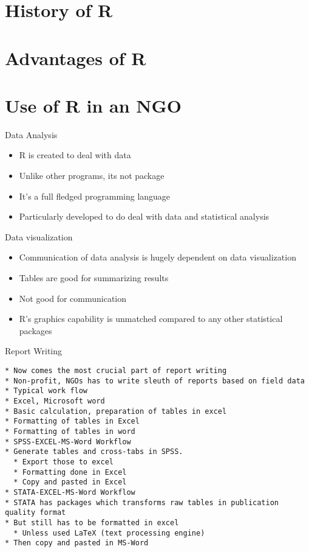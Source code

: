 \section{History of R}\label{history-of-r}

\section{Advantages of R}\label{advantages-of-r}

\section{Use of R in an NGO}\label{use-of-r-in-an-ngo}

\begin{frame}{Data Analysis}

\begin{itemize}
\tightlist
\item
  R is created to deal with data
\item
  Unlike other programs, its not package
\item
  It's a full fledged programming language
\item
  Particularly developed to do deal with data and statistical analysis
\end{itemize}

\end{frame}

\begin{frame}{Data visualization}

\begin{itemize}
\tightlist
\item
  Communication of data analysis is hugely dependent on data
  visualization
\item
  Tables are good for summarizing results
\item
  Not good for communication
\item
  R's graphics capability is unmatched compared to any other statistical
  packages
\end{itemize}

\end{frame}

\begin{frame}[fragile]{Report Writing}

\begin{verbatim}
* Now comes the most crucial part of report writing
* Non-profit, NGOs has to write sleuth of reports based on field data
* Typical work flow
* Excel, Microsoft word
* Basic calculation, preparation of tables in excel
* Formatting of tables in Excel
* Formatting of tables in word
* SPSS-EXCEL-MS-Word Workflow
* Generate tables and cross-tabs in SPSS. 
  * Export those to excel
  * Formatting done in Excel
  * Copy and pasted in Excel
* STATA-EXCEL-MS-Word Workflow
* STATA has packages which transforms raw tables in publication quality format
* But still has to be formatted in excel 
  * Unless used LaTeX (text processing engine)
* Then copy and pasted in MS-Word
\end{verbatim}

\end{frame}

